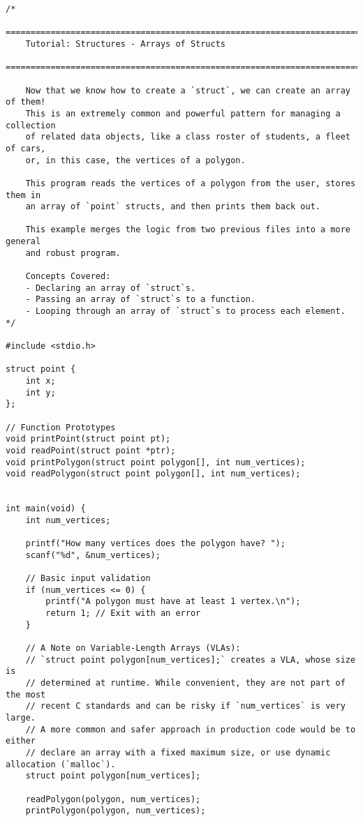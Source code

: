 \documentclass[11pt]{book}
\begin{document}
\begin{verbatim}
/*
    ================================================================================
    Tutorial: Structures - Arrays of Structs
    ================================================================================

    Now that we know how to create a `struct`, we can create an array of them!
    This is an extremely common and powerful pattern for managing a collection
    of related data objects, like a class roster of students, a fleet of cars,
    or, in this case, the vertices of a polygon.

    This program reads the vertices of a polygon from the user, stores them in
    an array of `point` structs, and then prints them back out.

    This example merges the logic from two previous files into a more general
    and robust program.

    Concepts Covered:
    - Declaring an array of `struct`s.
    - Passing an array of `struct`s to a function.
    - Looping through an array of `struct`s to process each element.
*/

#include <stdio.h>

struct point {
    int x;
    int y;
};

// Function Prototypes
void printPoint(struct point pt);
void readPoint(struct point *ptr);
void printPolygon(struct point polygon[], int num_vertices);
void readPolygon(struct point polygon[], int num_vertices);


int main(void) {
    int num_vertices;

    printf("How many vertices does the polygon have? ");
    scanf("%d", &num_vertices);

    // Basic input validation
    if (num_vertices <= 0) {
        printf("A polygon must have at least 1 vertex.\n");
        return 1; // Exit with an error
    }

    // A Note on Variable-Length Arrays (VLAs):
    // `struct point polygon[num_vertices];` creates a VLA, whose size is
    // determined at runtime. While convenient, they are not part of the most
    // recent C standards and can be risky if `num_vertices` is very large.
    // A more common and safer approach in production code would be to either
    // declare an array with a fixed maximum size, or use dynamic allocation (`malloc`).
    struct point polygon[num_vertices];

    readPolygon(polygon, num_vertices);
    printPolygon(polygon, num_vertices);


\end{verbatim}
\end{document}
